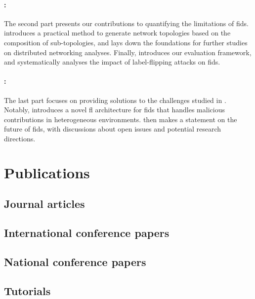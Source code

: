 \paragraph{:}

The second part presents our contributions to quantifying the limitations of \gls{fids}.
 introduces a practical method to generate network topologies based on the composition of sub-topologies, and lays down the foundations for further studies on distributed networking analyses.
Finally,  introduces our evaluation framework, and systematically analyses the impact of label-flipping attacks on \gls{fids}.

\paragraph{:}

The last part focuses on providing solutions to the challenges studied in .
Notably,  introduces a novel \gls{fl} architecture for \gls{fids} that handles malicious contributions in heterogeneous environments.
 then makes a statement on the future of \gls{fids}, with discussions about open issues and potential research directions.



\section{Publications\label{sec:intro.publications}}

\begin{refsection}
  \nocite{*}
  \subsection*{Journal articles}
  \printbibliography[heading=none,type=article]
  \subsection*{International conference papers}
  \printbibliography[heading=none,type=inproceedings,keyword=confs]
  \subsection*{National conference papers}
  \printbibliography[heading=none,type=inproceedings,keyword=national]
  \subsection*{Tutorials}
  \printbibliography[heading=none,keyword=tutorial]
\end{refsection}